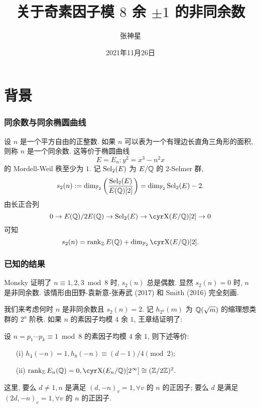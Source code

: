 \documentclass{beamer}
\begin{document}
\title{关于奇素因子模 $8$ 余 $\pm1$ 的非同余数}
\author{张神星}
\date{2021年11月26日}

\frame{
\titlepage
}

\section{背景}

\begin{frame}
\frametitle{同余数与同余椭圆曲线}
设 $n$ 是一个平方自由的正整数. 如果 $n$ 可以表为一个有理边长直角三角形的面积, 则称 $n$ 是一个同余数.  
这等价于椭圆曲线
\[E=E_n: y^2=x^3-n^2x\]
的 Mordell-Weil 秩至少为 $1$.  
记 $\operatorname{Sel}_2(E)$ 为 $E/{\mathbb{Q}}$ 的 $2$-Selmer 群,
\[s_2(n):=\dim_{{\mathbb{F}}_2}\left(\frac{\operatorname{Sel}_2(E)}{E({\mathbb{Q}})[2]}\right)
		=\dim_{{\mathbb{F}}_2}\operatorname{Sel}_2(E)-2.\]  
由长正合列
\[0\ra E(\BQ)/2E(\BQ)\ra \Sel_2(E)\ra \Sha(E/\BQ)[2]\ra0\]
可知
\[s_2(n)=\rank_\BZ E(\BQ)+\dim_{\BF_2}\Sha(E/\BQ)[2].\]
\end{frame}


\begin{frame}
\frametitle{已知的结果}
Monsky 证明了 $n\equiv 1,2,3\bmod8$ 时, $s_2(n)$ 总是偶数.  
显然 $s_2(n)=0$ 时, $n$ 是非同余数. 该情形由田野-袁新意-张寿武 (2017) 和 Smith (2016) 完全刻画. 

我们来考虑何时 $n$ 是非同余数且 $s_2(n)=2$. 记 $h_{2^a}(m)$ 为 ${\mathbb{Q}}(\sqrt{m})$ 的缩理想类群的 $2^a$ 阶秩.  
如果 $n$ 的素因子均模 $4$ 余 $1$, 王章结证明了:
\begin{theorem}[王章结, 2016]
设 $n=p_1\cdots p_k\equiv 1\bmod 8$ 的素因子均模 $4$ 余 $1$, 则下述等价:
\begin{itemize}
\item[(i)] $h_4(-n)=1, h_8(-n)\equiv (d-1)/4\pmod 2$;
\item[(ii)] $\rank_\BZ E_n(\BQ)=0,\Sha(E_n/\BQ)[2^\infty]\cong(\BZ/2\BZ)^2.$
\end{itemize}
这里, 要么 $d\neq 1,n$ 是满足 $(d,-n)_v=1,\forall v$ 的 $n$ 的正因子; 要么 $d$ 是满足 $(2d,-n)_v=1,\forall v$ 的 $n$ 的正因子.
\end{theorem}
\end{frame}
\end{document}
